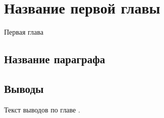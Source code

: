 \chapter{Название первой главы} \label{ch1}
Первая глава
\section{Название параграфа} \label{ch1:sec1}

\section{Выводы} \label{ch1:conclusion}

Текст выводов по главе \thechapter.
